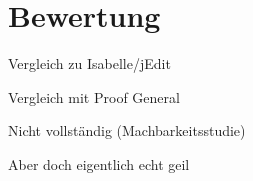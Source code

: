 \chapter{Bewertung}

Vergleich zu Isabelle/jEdit

Vergleich mit Proof General

Nicht vollständig (Machbarkeitsstudie)

Aber doch eigentlich echt geil